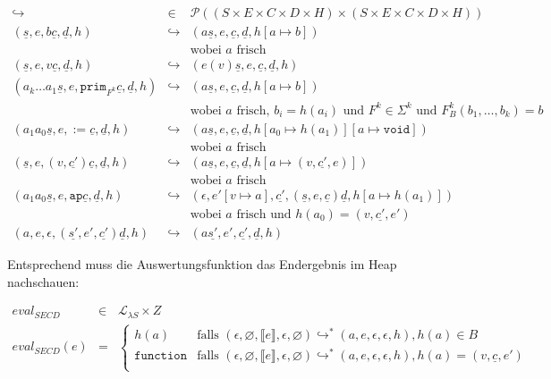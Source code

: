 \begin{eqnarray*}
  \hookrightarrow &\in& \mathcal{P}((S\times E\times C\times D\times H) \times (S\times E\times C\times D\times H))\\
  (\underline{s}, e, b\underline{c}, \underline{d}, h)
  &\hookrightarrow& 
  (a\underline{s}, e, \underline{c}, \underline{d}, h[a \mapsto b] )
  \\ && \textrm{wobei $a$ frisch}
  \\
  (\underline{s}, e, v\underline{c}, \underline{d}, h)
  &\hookrightarrow&
  (e(v)\underline{s}, e, \underline{c}, \underline{d}, h)
  \\
  (a_k\ldots a_1\underline{s}, e, \mathtt{prim}_{F^k}\underline{c},
  \underline{d}, h)
  &\hookrightarrow&
  (a\underline{s}, e, \underline{c}, \underline{d}, h[a\mapsto b] )
  \\ && \textrm{wobei $a$ frisch, $b_i = h(a_i)$ und $F^k\in\Sigma^k$ und $F^k_B(b_1,\ldots,b_k) = b$}
  \\
  (a_1a_0\underline{s}, e, \mathtt{:=} \underline{c}, \underline{d}, h)
  &\hookrightarrow&
  (a\underline{s}, e, \underline{c}, \underline{d}, h[a_0 \mapsto
  h(a_1)][a\mapsto \mathtt{void}] )
  \\ && \textrm{wobei $a$ frisch}
  \\
  (\underline{s}, e, (v, \underline{c'})\underline{c}, \underline{d},
  h)
  &\hookrightarrow&
  (a\underline{s}, e, \underline{c}, \underline{d}, h[a \mapsto (v,
  \underline{c'}, e)] )
  \\ && \textrm{wobei $a$ frisch}
  \\
  (a_1a_0\underline{s}, e, \mathtt{ap}\underline{c}, \underline{d}, h)
  &\hookrightarrow&
  (\epsilon, e'[v\mapsto a], \underline{c'}, (\underline{s}, e,
  \underline{c}) \underline{d}, h[a\mapsto h(a_1)])
  \\ && \textrm{wobei $a$ frisch und $h(a_0) = (v, \underline{c'}, e')$}
  \\
  (a, e, \epsilon, (\underline{s'}, e', \underline{c'}) \underline{d}, h)
  &\hookrightarrow&
  (a\underline{s'}, e', \underline{c'}, \underline{d}, h)
\end{eqnarray*}

Entsprechend muss die Auswertungsfunktion das Endergebnis im Heap nachschauen:

\begin{eqnarray*}
  \mathit{eval}_\mathit{SECD} & \in & \mathcal{L}_{\lambda{}S} \times Z\\
  \mathit{eval}_\mathit{SECD}(e) & = &
  \begin{cases}
    h(a) & \textrm{falls } (\epsilon, \varnothing, \llbracket
    e\rrbracket, \epsilon, \varnothing)
    \hookrightarrow^* (a, e, \epsilon, \epsilon, h), h(a) \in B\\
    \texttt{function} & \textrm{falls } (\epsilon, \varnothing, \llbracket e\rrbracket, \epsilon,\varnothing)
    \hookrightarrow^* (a, e, \epsilon, \epsilon, h), h(a) = (v, \underline{c}, e')\\
  \end{cases}
\end{eqnarray*}


